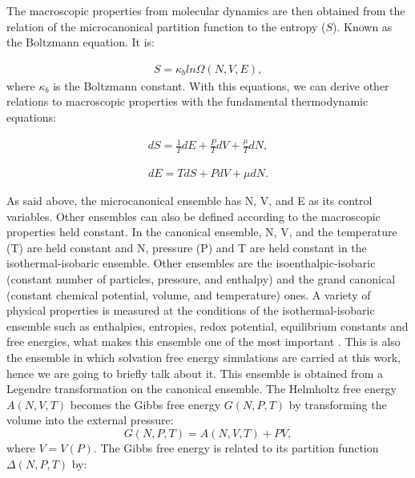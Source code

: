 The macroscopic properties from molecular dynamics are then obtained from the relation of the microcanonical partition function to the entropy ($S$). Known as the Boltzmann equation. It is:

\begin{equation}
\begin{aligned}
S = \kappa_{b} ln \Omega (N,V,E), 
\end{aligned}
\end{equation}
where $\kappa_{b}$ is the Boltzmann constant. With this equations, we can derive other relations to macroscopic properties with the fundamental thermodynamic equations:

\begin{equation}
\begin{aligned}
dS = \frac{1}{T} dE + \frac{P}{T} dV + \frac{\mu}{T} dN,
\end{aligned}
\end{equation}

\begin{equation}
\begin{aligned}
dE = T dS + P dV + \mu dN .
\end{aligned}
\end{equation}

As said above, the microcanonical ensemble  has  N, V, and E as its control variables. Other ensembles can also be defined according to the macroscopic properties held constant.  In the canonical ensemble,  N, V, and the temperature (T) are held constant and  N, pressure (P) and T are held constant in the isothermal-isobaric ensemble. Other ensembles are the isoenthalpic-isobaric (constant number of particles, pressure, and enthalpy) and the grand canonical (constant chemical potential, volume, and temperature) ones. A variety of physical properties is measured at the conditions of the isothermal-isobaric ensemble such as enthalpies, entropies, redox potential, equilibrium constants and free energies, what makes this ensemble one of the most important \cite{tuckerman}. This is also the ensemble in which solvation free energy simulations are carried at this work, hence we are going to briefly talk about it. This ensemble is obtained from a Legendre transformation on the canonical ensemble. The Helmholtz free energy $A(N,V,T)$ becomes the Gibbs free energy $G(N,P,T)$ by transforming the volume into the external pressure:
\begin{equation}
G(N,P,T) = A(N,V,T) + PV,
\end{equation}
where $V = V(P)$. The Gibbs free energy is related to its partition function $\Delta (N,P,T)$ by:


